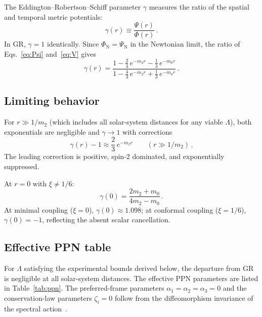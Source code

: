 \documentclass[aps,prd,twocolumn,superscriptaddress,nofootinbib,floatfix]{revtex4-2}
\begin{document}
The Eddington--Robertson--Schiff parameter $\gamma$ measures the ratio
of the spatial and temporal metric potentials:
\begin{equation}
  \gamma(r) \equiv \frac{\Psi(r)}{\Phi(r)}\,.
  \label{eq:gamma-def}
\end{equation}
In GR, $\gamma = 1$ identically. Since $\Phi_\mathrm{N} = \Psi_\mathrm{N}$
in the Newtonian limit, the ratio of
Eqs.~\eqref{eq:Psi} and~\eqref{eq:V} gives
\begin{equation}
  \boxed{
    \gamma(r)
    = \frac{1 - \frac{2}{3}\,e^{-m_2 r}
            - \frac{1}{3}\,e^{-m_0 r}}
           {1 - \frac{4}{3}\,e^{-m_2 r}
            + \frac{1}{3}\,e^{-m_0 r}}\,.}
  \label{eq:gamma}
\end{equation}

\subsection{Limiting behavior}

For $r \gg 1/m_2$ (which includes all solar-system distances for any
viable $\Lambda$), both exponentials are negligible and
$\gamma \to 1$ with corrections
\begin{equation}
  \gamma(r) - 1 \approx \frac{2}{3}\,e^{-m_2 r}
  \qquad (r \gg 1/m_2)\,.
  \label{eq:gamma-asymp}
\end{equation}
The leading correction is positive, spin-2 dominated, and exponentially
suppressed.

At $r = 0$ with $\xi \neq 1/6$:
\begin{equation}
  \gamma(0) = \frac{2m_2 + m_0}{4m_2 - m_0}\,.
  \label{eq:gamma-zero}
\end{equation}
At minimal coupling ($\xi = 0$),
$\gamma(0) \approx 1.098$; at conformal coupling
($\xi = 1/6$), $\gamma(0) = -1$, reflecting the absent scalar
cancellation.

\subsection{Effective PPN table}

For $\Lambda$ satisfying the experimental bounds derived below, the
departure from GR is negligible at all solar-system distances. The
effective PPN parameters are listed in Table~\ref{tab:ppn}. The
preferred-frame parameters $\alpha_1 = \alpha_2 = \alpha_3 = 0$ and
the conservation-law parameters $\zeta_i = 0$ follow from the
diffeomorphism invariance of the spectral
action~\cite{Will:2014,Chamseddine:1996zu}.
\end{document}
